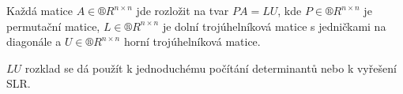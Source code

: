 \documentclass[12pt]{article}					%
\begin{document}
    \begin{tvrzeni}
        Každá matice $A \in ®R^{n\times n}$ jde rozložit na tvar $PA = LU$, kde $P \in ®R^{n\times n}$ je permutační matice, $L \in ®R^{n\times n}$ je dolní trojúhelníková matice s jedničkami na diagonále a $U \in ®R^{n\times n}$ horní trojúhelníková matice.
    \end{tvrzeni}

    \begin{poznamka}
        $LU$ rozklad se dá použít k jednoduchému počítání determinantů nebo k vyřešení SLR.
    \end{poznamka}
\end{document}
